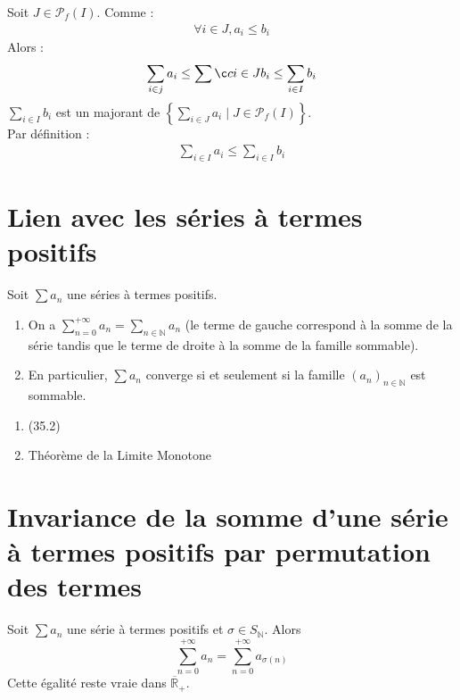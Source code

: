 \documentclass[../main.tex]{subfiles}
\begin{document}
\noindent Soit $J\in \mathcal{P}_f(I)$. Comme : 
\begin{align*}
    \forall i\in J, a_i\leq b_i
\end{align*}
Alors : 
\begin{align*}
    \sum_{i\in j} a_i \leq \sumç{i\in J} b_i \leq \sum_{i\in I} b_i
\end{align*}
$\sum\limits_{i\in I} b_i$ est un majorant de $\left\{ \sum_{i\in J} a_i\mid J\in \mathcal{P}_f(I) \right\}$. \\
Par définition : 
\begin{align*}
    \sum_{i\in I} a_i \leq \sum_{i\in I} b_i
\end{align*}

\section{Lien avec les séries à termes positifs}
\begin{tcolorbox}[title=Propostion 35.8, title filled=false, colframe=lightblue, colback=lightblue!10!white]
    Soit $\sum a_n$ une séries à termes positifs.
    \begin{enumerate}
        \item On a $\sum_{n=0}^{+\infty} a_n=\sum_{n \in \mathbb{N}} a_n$ (le terme de gauche correspond à la somme de la série tandis que le terme de droite à la somme de la famille sommable). 
        \item En particulier, $\sum a_n$ converge si et seulement si la famille $\left(a_n\right)_{n \in \mathbb{N}}$ est sommable. 
    \end{enumerate}
\end{tcolorbox}

\begin{enumerate}
    \item (35.2)
    \item Théorème de la Limite Monotone
\end{enumerate}

\section{Invariance de la somme d'une série à termes positifs par permutation des termes}
\begin{tcolorbox}[title=Corollaire 35.10, title filled=false, colframe=orange, colback=orange!10!white]
    Soit $\sum a_n$ une série à termes positifs et $\sigma \in S_{\mathbb{N}}$. Alors
    $$\sum_{n=0}^{+\infty} a_n=\sum_{n=0}^{+\infty} a_{\sigma(n)}$$
    Cette égalité reste vraie dans $\overline{\mathbb{R}}_{+}$.
\end{tcolorbox}
\end{document}
